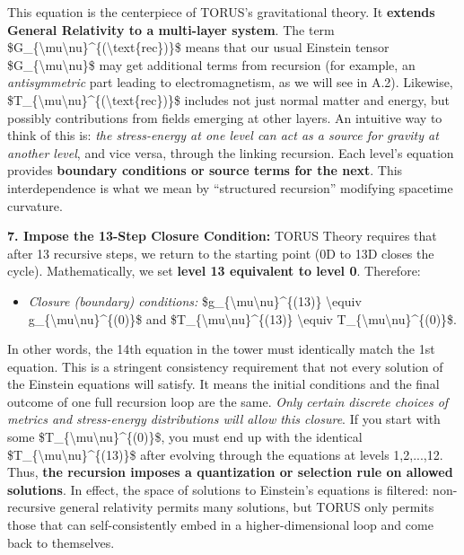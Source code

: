 \documentclass[]{article}
\begin{document}
This equation is the centerpiece of TORUS's gravitational theory. It
\textbf{extends General Relativity to a multi-layer system}. The term
\$G\_\{\textbackslash{}mu\textbackslash{}nu\}\^{}\{(\textbackslash{}text\{rec\})\}\$
means that our usual Einstein tensor
\$G\_\{\textbackslash{}mu\textbackslash{}nu\}\$ may get additional terms
from recursion (for example, an \emph{antisymmetric} part leading to
electromagnetism, as we will see in A.2). Likewise,
\$T\_\{\textbackslash{}mu\textbackslash{}nu\}\^{}\{(\textbackslash{}text\{rec\})\}\$
includes not just normal matter and energy, but possibly contributions
from fields emerging at other layers. An intuitive way to think of this
is: \emph{the stress-energy at one level can act as a source for gravity
at another level}, and vice versa, through the linking recursion. Each
level's equation provides \textbf{boundary conditions or source terms
for the next}​. This interdependence is what we mean by ``structured
recursion'' modifying spacetime curvature.

\textbf{7. Impose the 13-Step Closure Condition:} TORUS Theory requires
that after 13 recursive steps, we return to the starting point (0D to
13D closes the cycle). Mathematically, we set \textbf{level 13
equivalent to level 0}. Therefore:

\begin{itemize}
\item
  \emph{Closure (boundary) conditions:}
  \$g\_\{\textbackslash{}mu\textbackslash{}nu\}\^{}\{(13)\}
  \textbackslash{}equiv
  g\_\{\textbackslash{}mu\textbackslash{}nu\}\^{}\{(0)\}\$ and
  \$T\_\{\textbackslash{}mu\textbackslash{}nu\}\^{}\{(13)\}
  \textbackslash{}equiv
  T\_\{\textbackslash{}mu\textbackslash{}nu\}\^{}\{(0)\}\$​.
\end{itemize}

In other words, the 14th equation in the tower must identically match
the 1st equation. This is a stringent consistency requirement that not
every solution of the Einstein equations will satisfy. It means the
initial conditions and the final outcome of one full recursion loop are
the same. \emph{Only certain discrete choices of metrics and
stress-energy distributions will allow this closure}. If you start with
some \$T\_\{\textbackslash{}mu\textbackslash{}nu\}\^{}\{(0)\}\$, you
must end up with the identical
\$T\_\{\textbackslash{}mu\textbackslash{}nu\}\^{}\{(13)\}\$ after
evolving through the equations at levels 1,2,...,12. Thus, \textbf{the
recursion imposes a quantization or selection rule on allowed
solutions}​. In effect, the space of solutions to Einstein's equations
is filtered: non-recursive general relativity permits many solutions,
but TORUS only permits those that can self-consistently embed in a
higher-dimensional loop and come back to themselves.
\end{document}
